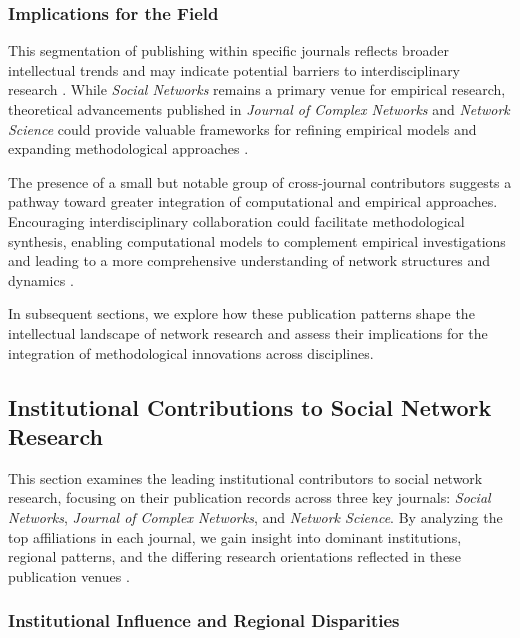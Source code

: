 \documentclass[twocolumn]{article}
\begin{document}
	
	\subsubsection*{Implications for the Field}
	
	This segmentation of publishing within specific journals reflects broader intellectual trends and may indicate potential barriers to interdisciplinary research \cite{Leahey2016,Porter2009}. While \textit{Social Networks} remains a primary venue for empirical research, theoretical advancements published in \textit{Journal of Complex Networks} and \textit{Network Science} could provide valuable frameworks for refining empirical models and expanding methodological approaches \cite{Chavarro2017,Wagner2011}.
	
	The presence of a small but notable group of cross-journal contributors suggests a pathway toward greater integration of computational and empirical approaches. Encouraging interdisciplinary collaboration could facilitate methodological synthesis, enabling computational models to complement empirical investigations and leading to a more comprehensive understanding of network structures and dynamics \cite{Rafols2010,VanNoorden2015}.
	
	In subsequent sections, we explore how these publication patterns shape the intellectual landscape of network research and assess their implications for the integration of methodological innovations across disciplines.
	
	
	
	\subsection{Institutional Contributions to Social Network Research}\label{Institutional Contributions to Social Network Research}
	
	This section examines the leading institutional contributors to social network research, focusing on their publication records across three key journals: \textit{Social Networks}, \textit{Journal of Complex Networks}, and \textit{Network Science}. By analyzing the top affiliations in each journal, we gain insight into dominant institutions, regional patterns, and the differing research orientations reflected in these publication venues \cite{Wagner2018, Glanzel2015, Leydesdorff2021}.
	
	\subsubsection*{Institutional Influence and Regional Disparities}
	
\end{document}
